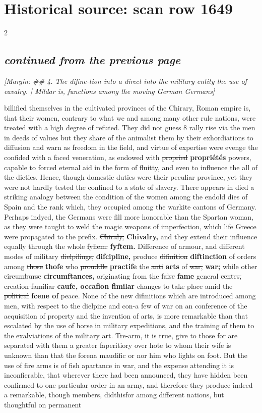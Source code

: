 \documentclass[10pt]{article}
\begin{document}
\section*{Historical source: scan row 1649}
\begin{multicols}{2}
\subsection*{\textit{continued from the previous page}}
{\small\itshape [Margin: \#\# 4. The difine-tion into a direct into the military entity the use of cavalry. | Mildar is, functions among the moving German Germans]}\par
billified themselves in the cultivated provinces of the Chirary, Roman empire is, that their women, contrary to what we and among many other rule nations, were treated with a high degree of refuted. They did not guess 8 rally rise via the men in deeds of values but they share of the animalist them by their exhordiations to diffusion and warn as freedom in the field, and virtue of expertise were evenge the confided with a faced veneration, as endowed with \sout{propried} \textbf{propriétés} powers, capable to forced eternal aid in the form of fluitty, and even to influence the all of the dieties. Hence, though domestic duties were their peculiar province, yet they were not hardly tested the confined to a state of slavery. There appears in died a striking analogy between the condition of the women among the endold dies of Spain and the rank which, they occupied among the warkite cantons of Germany. Perhaps indyed, the Germans were fill more honorable than the Spartan woman, as they were taught to weld the magic weapons of imperfection, which life Greece were propagated to the prefix. \sout{Chiraly,} \textbf{Chivalry,} and they extend their influence equally through the whole \sout{fyllem.} \textbf{fyftem.} Difference of armour, and different modes of military \sout{dielpilings,} \textbf{difcipline,} produce \sout{difinition} \textbf{diftinction} of orders among \sout{those} \textbf{thofe} who \sout{prouddle} \textbf{practife} the \sout{anti} \textbf{arts} of \sout{war,} \textbf{war;} while other \sout{circumburse} \textbf{circumftances,} originating from the \sout{false} \textbf{fame} general \sout{centes, creation familiar} \textbf{caufe, occafion fimilar} changes to take place amid the \sout{political} \textbf{fcene of} peace. None of the new difinitions which are introduced among men, with respect to the dielpine and con-a few of war on an conference of the acquisition of property and the invention of arts, is more remarkable than that escalated by the use of horse in military expeditions, and the training of them to the exalviations of the military art. Tre-arm, it is true, give to those for are separated with them a greater faperitiory over hote to whom their wife is unknown than that the forena maudific or nor him who lights on foot. But the use of fire arms is of fish apartance in war, and the expense attending it is inconfierable, that wherever there had been announced, they have hidden been confirmed to one particular order in an army, and therefore they produce indeed a remarkable, though members, didthisfor among different nations, but thoughtful on permanent 
\end{multicols}
\end{document}
